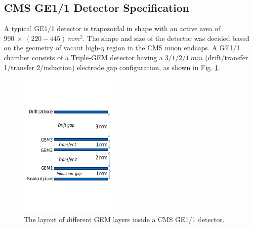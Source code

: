 \subsection{CMS GE1/1 Detector Specification} %
\label{sub:GE1/1_detector_details}
A typical GE1/1 detector is trapezoidal in shape with an active area of $990~\times~(220-445)~mm^2$.
The shape and size of the detector was decided based on the geometry of vacant high-$\eta$ region in the CMS muon endcaps.
A GE1/1 chamber consists of a Triple-GEM detector having a $3/1/2/1~mm$ (drift/transfer 1/transfer 2/induction) electrode gap configuration, as shown in Fig. \ref{fig:tripple-gem}.
\begin{figure}[!htbp]
    \begin{center}
        \includegraphics[width=0.45\textwidth]{figures/GEM/tripple-gem.pdf}
        \caption{The layout of different GEM layers inside a CMS GE1/1 detector.}
        \label{fig:tripple-gem}
    \end{center}
\end{figure}
